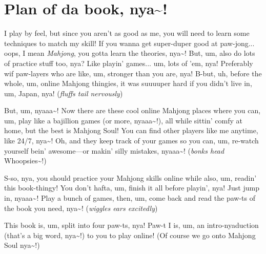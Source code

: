 %
%
%

\section*{Plan of da book, nya\textasciitilde!}

I play by feel, but since you aren’t as good as me, you will need to learn
some techniques to match my skill! If you wanna get super-duper good at
paw-jong... oops, I mean \textit{Mahjong}, you gotta learn the theories, nya\textasciitilde!
But, um, also do lots of practice stuff too, nya? Like playin' games... um,
lots of 'em, nya! Preferably wif paw-layers who are like, um, stronger than you
are, nya! B-but, uh, before the whole, um, online Mahjong thingies, it was
suuuuper hard if you didn’t live in, um, Japan, nya! (\textit{fluffs tail nervously})

But, um, nyaaa\textasciitilde! Now there are these cool online Mahjong places where you
can, um, play like a bajillion games (or more, nyaaa\textasciitilde!), all while sittin'
comfy at home, but the best is Mahjong Soul! You can find other players like me
anytime, like 24/7, nya\textasciitilde! Oh, and they keep track of your games so you can, um,
re-watch yourself bein' awesome—or makin’ silly mistakes, nyaaa\textasciitilde! (\textit{bonks
head} Whoopsies\textasciitilde!)

S-so, nya, you should practice your Mahjong skills online while also, um,
readin’ this book-thingy! You don’t hafta, um, finish it all before playin’,
nya! Just jump in, nyaaa\textasciitilde! Play a bunch of games, then, um, come back and read
the paw-ts of the book you need, nya\textasciitilde! (\textit{wiggles ears excitedly})

This book is, um, split into four paw-ts, nya! Paw-t I is, um, an
intro-nyaduction (that’s a big word, nya\textasciitilde!) to you to play online!
(Of course we go onto Mahjong Soul nya\textasciitilde!)

